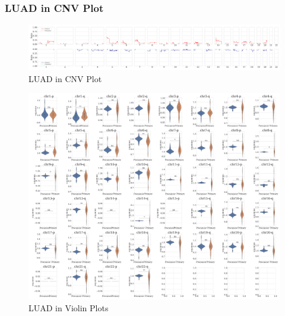\documentclass{beamer}
\begin{document}
    \begin{frame}[allowframebreaks]
        \frametitle{LUAD in CNV Plot}

        \begin{figure}
            \includegraphics[width=\linewidth]{figures/PureCN/BWA-simple-ADC.pdf}
            \caption{LUAD in CNV Plot}
        \end{figure}

        \begin{figure}
            \includegraphics[width=0.7 \linewidth]{figures/PureCN/BWA-violin-ADC.pdf}
            \caption{LUAD in Violin Plots}
        \end{figure}
    \end{frame}
\end{document}
